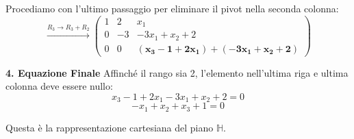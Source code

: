 {    Procediamo con l'ultimo passaggio per eliminare il pivot nella seconda colonna:
    \[
    \xrightarrow{R_3 \to R_3 + R_2}
    \begin{pmatrix} 
    1 & 2 & x_1 \\ 
    0 & -3 & -3x_1 + x_2 + 2 \\ 
    0 & 0 & \mathbf{(x_3 - 1 + 2x_1) + (-3x_1 + x_2 + 2)} 
    \end{pmatrix}
    \]

    \textbf{4. Equazione Finale}
    Affinché il rango sia 2, l'elemento nell'ultima riga e ultima colonna deve essere nullo:
    \[
    x_3 - 1 + 2x_1 - 3x_1 + x_2 + 2 = 0
    \]
    \[
    -x_1 + x_2 + x_3 + 1 = 0
    \]
    
    Questa è la rappresentazione cartesiana del piano \(\mathbb{H}\).
}

